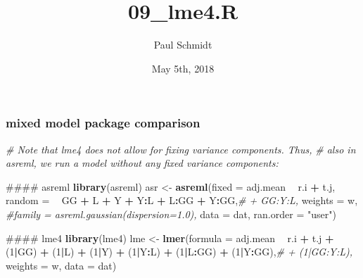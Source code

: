 \documentclass[]{article}
\title{09\_lme4.R}
\author{Paul Schmidt}
\date{May 5th, 2018}
\newenvironment{Shaded}{\begin{snugshade}}{\end{snugshade}}
\newcommand{\KeywordTok}[1]{\textcolor[rgb]{0.13,0.29,0.53}{\textbf{#1}}}
\newcommand{\DataTypeTok}[1]{\textcolor[rgb]{0.13,0.29,0.53}{#1}}
\newcommand{\DecValTok}[1]{\textcolor[rgb]{0.00,0.00,0.81}{#1}}
\newcommand{\StringTok}[1]{\textcolor[rgb]{0.31,0.60,0.02}{#1}}
\newcommand{\CommentTok}[1]{\textcolor[rgb]{0.56,0.35,0.01}{\textit{#1}}}
\newcommand{\OperatorTok}[1]{\textcolor[rgb]{0.81,0.36,0.00}{\textbf{#1}}}
\newcommand{\NormalTok}[1]{#1}
\begin{document}
\maketitle

\subsubsection{mixed model package
comparison}\label{mixed-model-package-comparison}

\begin{Shaded}
\begin{Highlighting}[]
\CommentTok{# Note that lme4 does not allow for fixing variance components. Thus,}
\CommentTok{# also in asreml, we run a model without any fixed variance components:}

\NormalTok{#### asreml}
\KeywordTok{library}\NormalTok{(asreml)}
\NormalTok{asr <-}\StringTok{ }\KeywordTok{asreml}\NormalTok{(}\DataTypeTok{fixed   =}\NormalTok{ adj.mean }\OperatorTok{~}\StringTok{ }\NormalTok{r.i }\OperatorTok{+}\StringTok{ }\NormalTok{t.j,}
              \DataTypeTok{random  =} \OperatorTok{~}\StringTok{ }\NormalTok{GG }\OperatorTok{+}\StringTok{ }\NormalTok{L }\OperatorTok{+}\StringTok{ }\NormalTok{Y }\OperatorTok{+}\StringTok{ }\NormalTok{Y}\OperatorTok{:}\NormalTok{L }\OperatorTok{+}\StringTok{ }\NormalTok{L}\OperatorTok{:}\NormalTok{GG }\OperatorTok{+}\StringTok{ }\NormalTok{Y}\OperatorTok{:}\NormalTok{GG,}\CommentTok{# + GG:Y:L, }
              \DataTypeTok{weights =}\NormalTok{ w,}
              \CommentTok{#family  = asreml.gaussian(dispersion=1.0),}
              \DataTypeTok{data    =}\NormalTok{ dat, }\DataTypeTok{ran.order =} \StringTok{"user"}\NormalTok{)}

\NormalTok{#### lme4}
\KeywordTok{library}\NormalTok{(lme4)}
\NormalTok{lme <-}\StringTok{ }\KeywordTok{lmer}\NormalTok{(}\DataTypeTok{formula =}\NormalTok{ adj.mean }\OperatorTok{~}\StringTok{ }\NormalTok{r.i }\OperatorTok{+}\StringTok{ }\NormalTok{t.j }\OperatorTok{+}\StringTok{ }
\StringTok{            }\NormalTok{(}\DecValTok{1}\OperatorTok{|}\NormalTok{GG) }\OperatorTok{+}\StringTok{ }\NormalTok{(}\DecValTok{1}\OperatorTok{|}\NormalTok{L) }\OperatorTok{+}\StringTok{ }\NormalTok{(}\DecValTok{1}\OperatorTok{|}\NormalTok{Y) }\OperatorTok{+}\StringTok{ }\NormalTok{(}\DecValTok{1}\OperatorTok{|}\NormalTok{Y}\OperatorTok{:}\NormalTok{L) }\OperatorTok{+}\StringTok{ }\NormalTok{(}\DecValTok{1}\OperatorTok{|}\NormalTok{L}\OperatorTok{:}\NormalTok{GG) }\OperatorTok{+}\StringTok{ }\NormalTok{(}\DecValTok{1}\OperatorTok{|}\NormalTok{Y}\OperatorTok{:}\NormalTok{GG),}\CommentTok{# + (1|GG:Y:L),}
            \DataTypeTok{weights =}\NormalTok{ w,}
            \DataTypeTok{data    =}\NormalTok{ dat)}
\end{Highlighting}
\end{Shaded}
\end{document}
